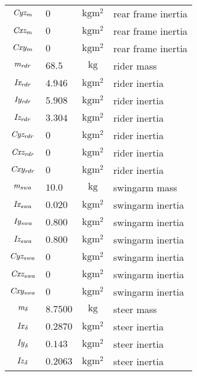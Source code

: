 \begin{longtable}{clcl}
$\it Cyz_m$  &  $0     $ &   $\si{\kilogram\metre^2}$       &  rear frame inertia  \\
$\it Cxz_m$  &  $0     $ &   $\si{\kilogram\metre^2}$       &  rear frame inertia  \\
$\it Cxy_m$  &  $0     $ &   $\si{\kilogram\metre^2}$       &  rear frame inertia  \\
$\it m_{rdr}  $  &  $68.5  $ &   $\si{\kilogram}$           &  rider mass          \\
$\it Ix_{rdr} $  &  $4.946 $ &   $\si{\kilogram\metre^2}$   &  rider inertia       \\
$\it Iy_{rdr} $  &  $5.908 $ &   $\si{\kilogram\metre^2}$   &  rider inertia       \\
$\it Iz_{rdr} $  &  $3.304 $ &   $\si{\kilogram\metre^2}$   &  rider inertia       \\
$\it Cyz_{rdr}$  &  $0     $ &   $\si{\kilogram\metre^2}$   &  rider inertia       \\
$\it Cxz_{rdr}$  &  $0     $ &   $\si{\kilogram\metre^2}$   &  rider inertia       \\
$\it Cxy_{rdr}$  &  $0     $ &   $\si{\kilogram\metre^2}$   &  rider inertia       \\
$\it m_{swa}  $  &  $10.0  $ &   $\si{\kilogram}$           &  swingarm mass       \\
$\it Ix_{swa} $  &  $0.020 $ &   $\si{\kilogram\metre^2}$   &  swingarm inertia    \\    
$\it Iy_{swa} $  &  $0.800 $ &   $\si{\kilogram\metre^2}$   &  swingarm inertia    \\    
$\it Iz_{swa} $  &  $0.800 $ &   $\si{\kilogram\metre^2}$   &  swingarm inertia    \\    
$\it Cyz_{swa}$  &  $0     $ &   $\si{\kilogram\metre^2}$   &  swingarm inertia    \\    
$\it Cxz_{swa}$  &  $0     $ &   $\si{\kilogram\metre^2}$   &  swingarm inertia    \\    
$\it Cxy_{swa}$  &  $0     $ &   $\si{\kilogram\metre^2}$   &  swingarm inertia    \\    
${\it m}_{\delta}  $  &  $8.7500$ &   $\si{\kilogram}$      &  steer mass          \\    
${\it Ix}_{\delta} $  &  $0.2870$ &   $\si{\kilogram\metre^2}$    &  steer inertia       \\
${\it Iy}_{\delta} $  &  $0.143 $ &   $\si{\kilogram\metre^2}$    &  steer inertia       \\
${\it Iz}_{\delta} $  &  $0.2063$ &   $\si{\kilogram\metre^2}$    &  steer inertia       \\

\end{longtable}
